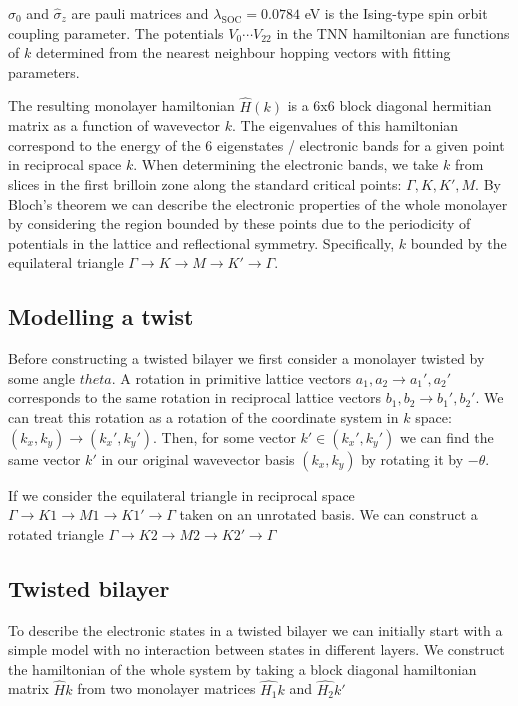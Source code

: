 \documentclass[10pt, twocolumn]{article} %
\begin{document}
  \item $\hat{\sigma}_0$ and $\hat{\sigma}_z$ are pauli matrices and $\lambda_{\text{SOC}}=0.0784$ eV is the Ising-type spin orbit coupling parameter. The potentials $V_0 \cdots V_{22}$ in the TNN hamiltonian are functions of $k$ determined from the nearest neighbour hopping vectors with fitting parameters.

    The resulting monolayer hamiltonian $\hat{H}(k)$ is a 6x6 block diagonal hermitian matrix as a function of wavevector $k$. The eigenvalues of this hamiltonian correspond to the energy of the 6 eigenstates / electronic bands for a given point in reciprocal space $k$. When determining the electronic bands, we take $k$ from slices in the first brilloin zone along the standard critical points: $\Gamma, K, K', M$. By Bloch's theorem we can describe the electronic properties of the whole monolayer by considering the region bounded by these points due to the periodicity of potentials in the lattice and reflectional symmetry. Specifically, $k$ bounded by the equilateral triangle $\Gamma \rightarrow K \rightarrow M \rightarrow K' \rightarrow \Gamma$.

\subsection*{Modelling a twist}

  Before constructing a twisted bilayer we first consider a monolayer twisted by some angle $theta$. A rotation in primitive lattice vectors $a_1, a_2 \rightarrow a_1', a_2'$ corresponds to the same rotation in reciprocal lattice vectors $b_1, b_2 \rightarrow b_1', b_2'$. We can treat this rotation as a rotation of the coordinate system in $k$ space: $(k_x, k_y) \rightarrow (k_x', k_y')$. Then, for some vector $k' \in (k_x', k_y')$ we can find the same vector $k'$ in our original wavevector basis $(k_x, k_y)$ by rotating it by $-\theta$.

  If we consider the equilateral triangle in reciprocal space $\Gamma \rightarrow K1 \rightarrow M1 \rightarrow K1' \rightarrow \Gamma$ taken on an unrotated basis. We can construct a rotated triangle $\Gamma \rightarrow K2 \rightarrow M2 \rightarrow K2' \rightarrow \Gamma$

\subsection*{Twisted bilayer}

  To describe the electronic states in a twisted bilayer we can initially start with a simple model with no interaction between states in different layers. We construct the hamiltonian of the whole system by taking a block diagonal hamiltonian matrix $\hat{H}{k}$ from two monolayer matrices $\hat{H_1}{k}$ and $\hat{H_2}{k'}$
\end{document}
